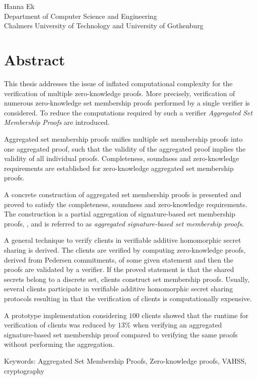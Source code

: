 \oneLineTitle\\
\oneLineSubtitle\\
Hanna Ek\\
Department of Computer Science and Engineering\\
Chalmers University of Technology and University of Gothenburg\setlength{\parskip}{0.5cm}

\thispagestyle{plain}			%
\setlength{\parskip}{0pt plus 1.0pt}
\section*{Abstract}
This thesis addresses the issue of inflated computational complexity for the verification of multiple zero-knowledge proofs. More precisely, verification of numerous zero-knowledge set membership proofs performed by a single verifier is considered. To reduce the computations required by such a verifier \textit{Aggregated Set Membership Proofs} are introduced.

Aggregated set membership proofs unifies multiple set membership proofs into one aggregated proof, such that the validity of the aggregated proof implies the validity of all individual proofs. Completeness, soundness and zero-knowledge requirements are established for zero-knowledge aggregated set membership proofs.

A concrete construction of aggregated set membership proofs is presented and proved to satisfy the completeness, soundness and zero-knowledge requirements. The construction is a partial aggregation of signature-based set membership proofs, \cite{RANGE-SET}, and is referred to as \textit{aggregated signature-based set membership proofs}. %

A general technique to verify clients in verifiable additive homomorphic secret sharing is derived. The clients are verified by computing zero-knowledge proofs, derived from Pedersen commitments, of some given statement and then the proofs are validated by a verifier.  If the proved statement is that the shared secrets belong to a discrete set, clients construct set membership proofs. Usually, several clients participate in verifiable additive homomorphic secret sharing protocols resulting in that the verification of clients is computationally expensive.
 
A prototype implementation considering $100$ clients showed that the runtime for verification of clients was reduced by $13\%$ when verifying an aggregated signature-based set membership proof compared to verifying the same proofs without performing the aggregation. 



\vfill
Keywords: Aggregated Set Membership Proofs, Zero-knowledge proofs, VAHSS, cryptography

\newpage				%
\thispagestyle{empty}
\mbox{}